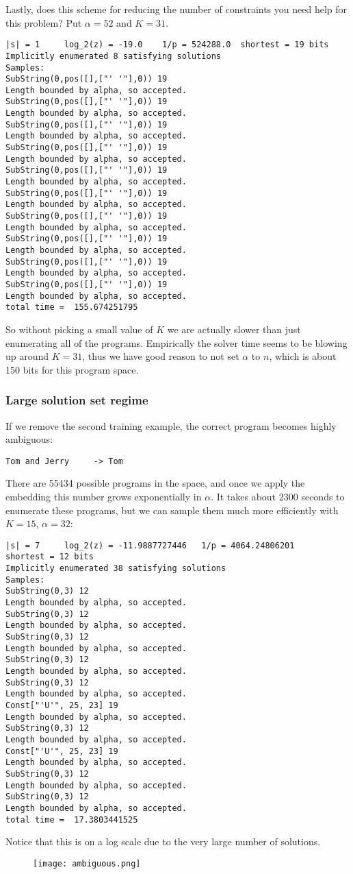 \documentclass{article}
\begin{document}
Lastly, does this scheme for reducing the number of constraints you need help for this problem?
Put $\alpha = 52$ and $K = 31$.
\begin{verbatim}
|s| = 1 	log_2(z) = -19.0 	1/p = 524288.0 	shortest = 19 bits
Implicitly enumerated 8 satisfying solutions
Samples:
SubString(0,pos([],["' '"],0)) 19
Length bounded by alpha, so accepted.
SubString(0,pos([],["' '"],0)) 19
Length bounded by alpha, so accepted.
SubString(0,pos([],["' '"],0)) 19
Length bounded by alpha, so accepted.
SubString(0,pos([],["' '"],0)) 19
Length bounded by alpha, so accepted.
SubString(0,pos([],["' '"],0)) 19
Length bounded by alpha, so accepted.
SubString(0,pos([],["' '"],0)) 19
Length bounded by alpha, so accepted.
SubString(0,pos([],["' '"],0)) 19
Length bounded by alpha, so accepted.
SubString(0,pos([],["' '"],0)) 19
Length bounded by alpha, so accepted.
SubString(0,pos([],["' '"],0)) 19
Length bounded by alpha, so accepted.
SubString(0,pos([],["' '"],0)) 19
Length bounded by alpha, so accepted.
total time =  155.674251795
\end{verbatim}
So without picking a small value of $K$ we are actually slower than just enumerating all of the programs.
Empirically the solver time seems to be blowing up around $K = 31$,
thus we have good reason to not set $\alpha$ to $n$, which is about 150 bits for this program space.

\subsubsection{Large solution set regime}
If we remove the second training example, the correct program becomes highly ambiguous:
\begin{verbatim}
Tom and Jerry     -> Tom
\end{verbatim}
There are 55434 possible programs in the space, and once we apply the embedding this number grows exponentially in $\alpha$.
It takes about 2300 seconds to enumerate these programs, but we can sample them much more efficiently with $K=15$, $\alpha = 32$:
\begin{verbatim}
|s| = 7 	log_2(z) = -11.9887727446 	1/p = 4064.24806201 	shortest = 12 bits
Implicitly enumerated 38 satisfying solutions
Samples:
SubString(0,3) 12
Length bounded by alpha, so accepted.
SubString(0,3) 12
Length bounded by alpha, so accepted.
SubString(0,3) 12
Length bounded by alpha, so accepted.
SubString(0,3) 12
Length bounded by alpha, so accepted.
SubString(0,3) 12
Length bounded by alpha, so accepted.
Const["'U'", 25, 23] 19
Length bounded by alpha, so accepted.
SubString(0,3) 12
Length bounded by alpha, so accepted.
Const["'U'", 25, 23] 19
Length bounded by alpha, so accepted.
SubString(0,3) 12
Length bounded by alpha, so accepted.
SubString(0,3) 12
Length bounded by alpha, so accepted.
total time =  17.3803441525
\end{verbatim}
Notice that this is on a log scale due to the very large number of solutions.
\begin{figure}
  \texttt{[image: ambiguous.png]}  
\end{figure}
\end{document}
